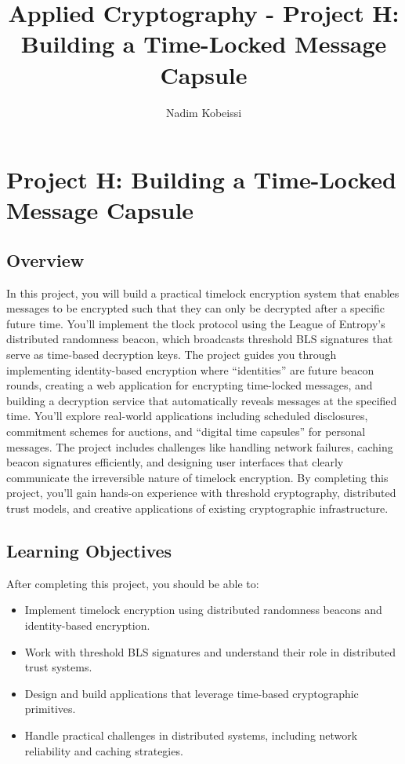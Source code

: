 \documentclass[10pt,a4paper,american]{exam}
\title{Applied Cryptography - Project H: Building a Time-Locked Message Capsule}
\author{Nadim Kobeissi}
\begin{document}
\classhandoutheader
\section*{Project H: Building a Time-Locked Message Capsule}

\subsection*{Overview}
In this project, you will build a practical timelock encryption system that enables messages to be encrypted such that they can only be decrypted after a specific future time. You'll implement the tlock protocol using the League of Entropy's distributed randomness beacon, which broadcasts threshold BLS signatures that serve as time-based decryption keys. The project guides you through implementing identity-based encryption where ``identities'' are future beacon rounds, creating a web application for encrypting time-locked messages, and building a decryption service that automatically reveals messages at the specified time. You'll explore real-world applications including scheduled disclosures, commitment schemes for auctions, and ``digital time capsules'' for personal messages. The project includes challenges like handling network failures, caching beacon signatures efficiently, and designing user interfaces that clearly communicate the irreversible nature of timelock encryption. By completing this project, you'll gain hands-on experience with threshold cryptography, distributed trust models, and creative applications of existing cryptographic infrastructure.

\subsection*{Learning Objectives}
After completing this project, you should be able to:
\begin{itemize}
	\item Implement timelock encryption using distributed randomness beacons and identity-based encryption.
	\item Work with threshold BLS signatures and understand their role in distributed trust systems.
	\item Design and build applications that leverage time-based cryptographic primitives.
	\item Handle practical challenges in distributed systems, including network reliability and caching strategies.
\end{itemize}
\end{document}
